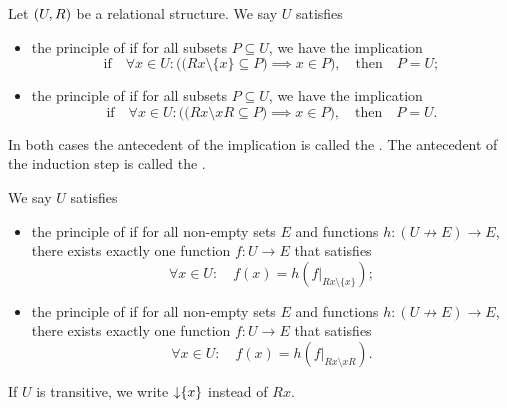 \begin{definition}
Let $\left( U, R \right)$ be a relational structure. We say $U$ satisfies
\begin{itemize}
\item the principle of  if for all subsets $P\subseteq U$, we have the implication
\[ \text{if}\quad  \forall x\in U: \Big(\big(Rx\setminus\{x\}\subseteq P\big)\implies x\in P\Big), \quad \text{then}\quad P=U; \]
\item the principle of  if for all subsets $P\subseteq U$, we have the implication
\[ \text{if}\quad  \forall x\in U: \Big(\big(Rx\setminus xR\subseteq P\big)\implies x\in P\Big), \quad \text{then}\quad P=U. \]
\end{itemize}
In both cases the antecedent of the implication is called the . The antecedent of the induction step is called the .

We say $U$ satisfies
\begin{itemize}
\item the principle of  if for all non-empty sets $E$ and functions $h: (U\not\to E)\to E$, there exists exactly one function $f: U\to E$ that satisfies
\[ \forall x\in U: \quad f(x) = h(f|_{Rx\setminus\{x\}}); \]
\item the principle of  if for all non-empty sets $E$ and functions $h: (U\not\to E)\to E$, there exists exactly one function $f: U\to E$ that satisfies
\[ \forall x\in U: \quad f(x) = h(f|_{Rx\setminus xR}). \]
\end{itemize}
\end{definition}

If $U$ is transitive, we write $\operatorname{\downarrow}\{x\}$ instead of $Rx$.

